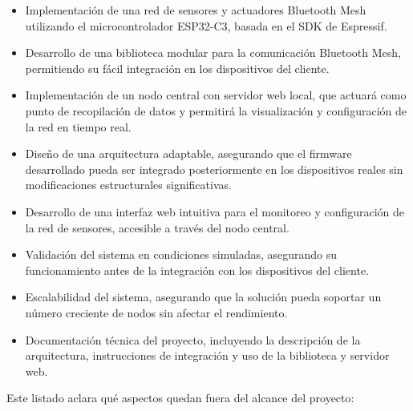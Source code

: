 \documentclass[
11pt, %
]{charter}
\begin{document}
\begin{itemize}
\item Implementación de una red de sensores y actuadores Bluetooth Mesh utilizando el microcontrolador ESP32-C3, basada en el SDK de Espressif.
\item Desarrollo de una biblioteca modular para la comunicación Bluetooth Mesh, permitiendo su fácil integración en los dispositivos del cliente.
\item Implementación de un nodo central con servidor web local, que actuará como punto de recopilación de datos y permitirá la visualización y configuración de la red en tiempo real.
\item Diseño de una arquitectura adaptable, asegurando que el firmware desarrollado pueda ser integrado posteriormente en los dispositivos reales sin modificaciones estructurales significativas.
\item Desarrollo de una interfaz web intuitiva para el monitoreo y configuración de la red de sensores, accesible a través del nodo central.
\item Validación del sistema en condiciones simuladas, asegurando su funcionamiento antes de la integración con los dispositivos del cliente.
\item Escalabilidad del sistema, asegurando que la solución pueda soportar un número creciente de nodos sin afectar el rendimiento.
\item Documentación técnica del proyecto, incluyendo la descripción de la arquitectura, instrucciones de integración y uso de la biblioteca y servidor web.

\end{itemize}



Este listado aclara qué aspectos quedan fuera del alcance del proyecto:
\end{document}
